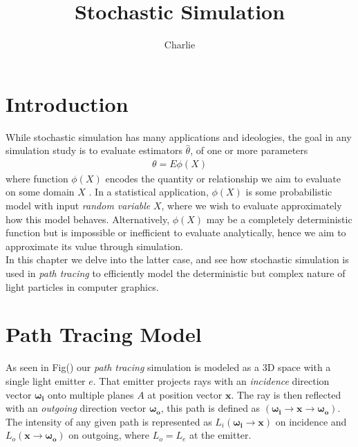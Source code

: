 \documentclass{article}
\author{Charlie}
\title{\vspace{-3cm}Stochastic Simulation}
\begin{document}

\maketitle

\section{Introduction}
While stochastic simulation has many applications and ideologies,
the goal in any simulation study is to evaluate estimators $\hat{\theta}$, 
of one or more parameters 
\begin{align}
    \theta = E\phi(X) \label{eq: expectation of loss function}
\end{align} 
where function $\phi(X)$ encodes the quantity or relationship we aim to evaluate 
on some domain $X$ \cite{alma9946168020001381}.
In a statistical application, $\phi(X)$ is some probabilistic model with input 
\textit{random variable} $X$,
where we wish to evaluate approximately how this model behaves.
Alternatively, $\phi(X)$ may be a completely deterministic function but is impossible or inefficient
to evaluate analytically, hence we aim to approximate its value through simulation.  
\\
In this chapter we delve into the latter case, and see how stochastic simulation 
is used in \textit{path tracing} to efficiently model the deterministic but complex nature 
of light particles in computer graphics.

\section{Path Tracing Model}
As seen in Fig() our \textit{path tracing} simulation is modeled as a 3D 
space with a single light emitter $e$.
That emitter projects rays with an \textit{incidence} direction vector $\boldsymbol{\omega_i}$
onto multiple planes $A$ at position vector $\boldsymbol{x}$.
The ray is then reflected with an \textit{outgoing} direction vector $\boldsymbol{\omega_o}$,
this path is defined as $(\boldsymbol{\omega_i}\rightarrow\boldsymbol{x}\rightarrow\boldsymbol{\omega_o})$.
The intensity of any given path is represented as $L_i(\boldsymbol{\omega_i}\rightarrow\boldsymbol{x})$
on incidence and $L_o(\boldsymbol{x}\rightarrow\boldsymbol{\omega_o})$ on outgoing, where 
$L_o=L_e$ at the emitter. 
\end{document}
